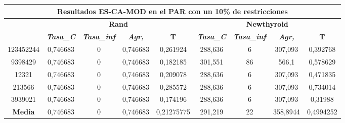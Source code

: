 \documentclass[12pt, spanish]{article}
\begin{document}
\begin{table}[H]
\begin{tabular}{|c|c|c|c|c|c|c|c|c|}
\hline
\multicolumn{9}{|c|}{\textbf{Resultados ES-CA-MOD en el PAR con un 10\% de restricciones}}                                                                                                                        \\ \hline
\multirow{2}{*}{} & \multicolumn{4}{c|}{\textbf{Rand}}                                                            & \multicolumn{4}{c|}{\textbf{Newthyroid}}                                                      \\ \cline{2-9} 
                  & \textit{\textbf{Tasa\_C}} & \textit{\textbf{Tasa\_inf}} & \textit{\textbf{Agr,}} & \textbf{T} & \textit{\textbf{Tasa\_C}} & \textit{\textbf{Tasa\_inf}} & \textit{\textbf{Agr,}} & \textbf{T} \\ \hline
123452244         & 0,746683                  & 0                           & 0,746683               & 0,261924   & 288,636                   & 6                           & 307,093                & 0,392768   \\ \hline
9398429           & 0,746683                  & 0                           & 0,746683               & 0,182185   & 301,551                   & 86                          & 566,1                  & 0,578629   \\ \hline
12321             & 0,746683                  & 0                           & 0,746683               & 0,209078   & 288,636                   & 6                           & 307,093                & 0,471835   \\ \hline
213566            & 0,746683                  & 0                           & 0,746683               & 0,285572   & 288,636                   & 6                           & 307,093                & 0,734014   \\ \hline
3939021           & 0,746683                  & 0                           & 0,746683               & 0,174196   & 288,636                   & 6                           & 307,093                & 0,31988    \\ \hline
\textbf{Media}    & 0,746683                  & 0                           & 0,746683               & 0,21275775 & 291,219                   & 22                          & 358,8944               & 0,4994252  \\ \hline
\end{tabular}
\end{table}
\end{document}
